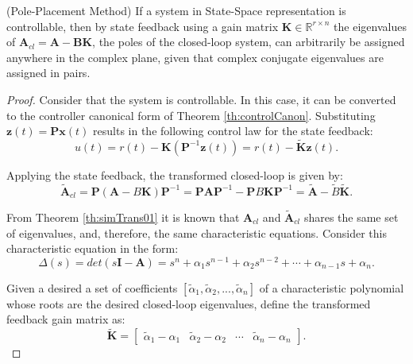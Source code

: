 \documentclass[a4paper,11pt]{book}
\numberwithin{figure}{chapter}
\numberwithin{equation}{chapter}
\numberwithin{table}{chapter}
\newtheorem{theorem}{Theorem}[chapter]
\theoremstyle{definition}
\newcounter{boxed-theorem}
\newenvironment{boxed-theorem}[1]
{\colorlet{shadecolor}{pastelBlue2!10} \begin{shaded} \begin{theorem}{#1}}
{\end{theorem} \end{shaded}}
\newcounter{boxed-definition}
\newcounter{boxed-example}
\begin{document}
\begin{boxed-theorem}{(Pole-Placement Method)} \label{th:polePlace}
    If a system in State-Space representation is controllable, then by state feedback using a gain matrix $\bm{K} \in \mathbb{R}^{r \times n}$ the eigenvalues of $\bm{A}_{cl}=\bm{A}-\bm{B}\bm{K}$, the poles of the closed-loop system, can arbitrarily be assigned anywhere in the complex plane, given that complex conjugate eigenvalues are assigned in pairs.
\end{boxed-theorem} 

\begin{proof}
    Consider that the system is controllable. In this case, it can be converted to the controller canonical form of Theorem \ref{th:controlCanon}. Substituting $\bm{z}(t) = \bm{P} \bm{x}(t)$ results in the following control law for the state feedback:
    \begin{equation}
        u(t) = r(t) - \bm{K} \left( \bm{P}^{-1} \bm{z}(t) \right) = r(t) - \tilde{\bm{K}} \bm{z}(t)
    .\end{equation}
    
    Applying the state feedback, the transformed closed-loop is given by:
    \begin{equation} \label{eq:fdbckContrCanon}
    \tilde{\bm{A}}_{cl} = \bm{P} (\bm{A} - B \bm{K}) \bm{P}^{-1} = \bm{P} \bm{A} \bm{P}^{-1} - \bm{P} B \bm{K} \bm{P}^{-1} = \tilde{\bm{A}} - \tilde{B} \tilde{\bm{K}}
    .\end{equation}   
    
    From Theorem \ref{th:simTrans01} it is known that $\bm{A}_{cl}$ and $\tilde{\bm{A}}_{cl}$ shares the same set of eigenvalues, and, therefore, the same characteristic equations. Consider this characteristic equation in the form:
    \begin{equation}
        \Delta(s) = det(s\bm{I} - \bm{A}) = s^n + \alpha_1 s^{n-1} + \alpha_2 s^{n-2} + \cdots + \alpha_{n-1} s + \alpha_n
    .\end{equation}
    
    Given a desired a set of coefficients $[\tilde{\alpha}_1, \tilde{\alpha}_2, ..., \tilde{\alpha}_n]$ of a characteristic polynomial whose roots are the desired closed-loop eigenvalues, define the transformed feedback gain matrix as:
    \begin{equation}
        \tilde{\bm{K}} = \begin{bmatrix} \tilde{\alpha}_1 - \alpha_1 & \tilde{\alpha}_2 - \alpha_2 & \cdots & \tilde{\alpha}_n - \alpha_n \end{bmatrix}
    .\end{equation}
    

\end{proof}
\end{document}
